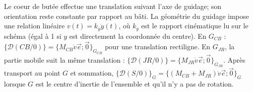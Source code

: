 \begin{corrigebox}
Le coeur de butée effectue une translation suivant l'axe de guidage;
                son orientation reste constante par rapport au bâti.
La géométrie du guidage impose une relation linéaire
                $v(t)=k_y\dot y(t)$, où $k_y$ est le rapport cinématique lu sur le schéma
                (égal à 1 si $y$ est directement la coordonnée du centre).
En $G_{CB}$ :
                $\{\mathcal D(CB/0)\}=\{M_{CB}\dot v\vec e;
                \vec0\}_{G_{CB}}$ pour une translation rectiligne.
En $G_{JR}$, la partie mobile suit la même translation :
                $\{\mathcal D(JR/0)\}=\{M_{JR}\dot v\vec e;\vec0\}_{G_{JR}}$.
Après transport au point $G$ et sommation,
                $\{\mathcal D(S/0)\}_G=\{(M_{CB}+M_{JR})\dot v\vec e;\vec0\}_G$
                lorsque $G$ est le centre d'inertie de l'ensemble et qu'il n'y a pas de
                rotation.
\end{corrigebox}
